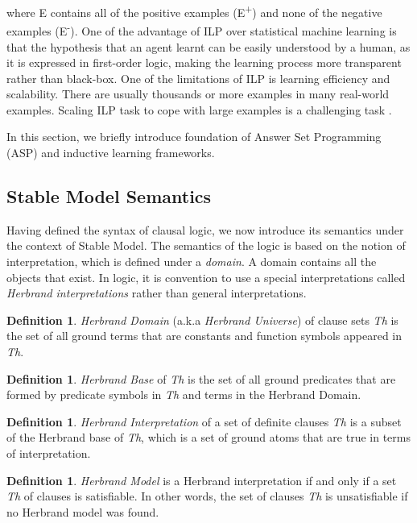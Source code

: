 \documentclass[12pt,twoside]{report}
\theoremstyle{plain}
\theoremstyle{definition}
\newtheorem{defn}[thm]{Definition} %
\begin{document}
where E contains all of the positive examples (E\textsuperscript{+}) and none of the negative examples (E\textsuperscript{-}).
One of the advantage of ILP over statistical machine learning is that the hypothesis that an agent learnt can be easily understood by a human, as it is expressed in first-order logic, making the learning process more transparent rather than black-box.
One of the limitations of ILP is learning efficiency and scalability. There are usually thousands or more examples in many real-world examples. Scaling ILP task to cope with large examples is a challenging task \cite{Muggleton1993}.

In this section, we briefly introduce foundation of Answer Set Programming (ASP) and inductive learning frameworks.

\subsection{Stable Model Semantics}

Having defined the syntax of clausal logic, we now introduce its semantics under the context of Stable Model. The semantics of the logic is based on the notion of interpretation, which is defined under a \textit{domain}. A domain contains all the objects that exist. In logic, it is convention to use a special interpretations called \textit{Herbrand interpretations} rather than general interpretations.

\begin{defn}
\textit{Herbrand Domain} (a.k.a \textit{Herbrand Universe}) of clause sets \textit{Th} is the set of all ground terms that are constants and function symbols appeared in \textit{Th}.
\end{defn}

\begin{defn}
\textit{Herbrand Base} of \textit{Th} is the set of all ground predicates that are formed by predicate symbols in \textit{Th} and terms in the Herbrand Domain.
\end{defn}

\begin{defn}
\textit{Herbrand Interpretation} of a set of definite clauses \textit{Th} is a subset of the Herbrand base of \textit{Th}, which is a set of ground atoms that are true in terms of interpretation.
\end{defn}

\begin{defn}
\textit{Herbrand Model} is a Herbrand interpretation if and only if a set \textit{Th} of clauses is satisfiable. In other words, the set of clauses \textit{Th} is unsatisfiable if no Herbrand model was found.
\end{defn}
\end{document}
